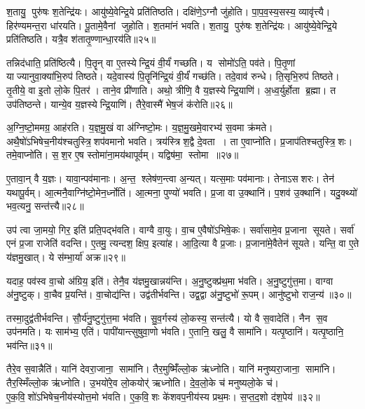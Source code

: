 श॒तायु॒ पुरु॑षः श॒तेन्द्रि॑यः।
आयु॑ष्ये॒वेन्द्रि॒ये प्रति॑तिष्ठति।
दक्षि॑णे॒ऽग्नौ जु॑होति।
पा॒प॒व॒स्य॒सस्य॒ व्यावृ॑त्त्यै।
हिर॑ण्यमन्त॒रा धा॑रयति।
पू॒तामे॒वैनां जुहोति।
श॒तमा॑नं भवति।
श॒तायु॒ पुरु॑षः श॒तेन्द्रि॑यः।
आयु॑ष्ये॒वेन्द्रि॒ये प्रति॑तिष्ठति।
यत्रै॒व श॑तातृ॒ण्णान्धा॒रय॑ति॥२५॥

तन्निद॑धाति॒ प्रति॑ष्ठित्यै।
पि॒तॄन् वा ए॒तस्येन्द्रि॒यं वी॒र्यं॑ गच्छति।
य सोमो॑ऽति॒ पव॑ते।
पि॒तृ॒णां याज्यानुवा॒क्या॑भि॒रुप॑ तिष्ठते।
यदे॒वास्य॑ पि॒तॄनि॑न्द्रि॒यं वी॒र्यं॑ गच्छ॑ति।
तदे॒वाव॑ रुन्धे।
ति॒सृभि॒रुप॑ तिष्ठते।
तृ॒तीये॒ वा इ॒तो लो॒के पि॒तर॑।
ताने॒व प्री॑णाति।
अथो॒ त्रीणि॒ वै य॒ज्ञस्येन्द्रि॒याणि॑।
अ॒ध्व॒र्युर्\mbox{}होता ब्र॒ह्मा।
त उप॑तिष्ठन्ते।
यान्ये॒व य॒ज्ञस्येन्द्रि॒याणि॑।
तैरे॒वास्मै॑ भेष॒जं क॑रोति॥२६॥\anuvakamend[प्री॒णा॒ति॒ प्र॒थ॒मो दक्षि॑णा स॒मव॑नयति धा॒रय॑तीन्द्रि॒याणि॑ च॒त्वारि॑ च]

अ॒ग्नि॒ष्टो॒ममग्र॒ आह॑रति।
य॒ज्ञ॒मु॒खं वा अ॑ग्निष्टो॒मः।
य॒ज्ञ॒मु॒खमे॒वारभ्य॑ स॒वमा क्र॑मते।
अथै॒षो॑ऽभिषेच॒नीय॑श्चतु\-स्त्रि॒शप॑वमानो भवति।
त्रय॑स्त्रिश॒द्वै दे॒वता।
ता ए॒वाप्नो॑ति।
प्र॒जाप॑तिश्चतुस्त्रि॒शः।
तमे॒वाप्नो॑ति।
स॒श॒र ए॒ष स्तोमा॑ना॒मय॑थापूर्वम्।
यद्विष॑मा॒ स्तोमा॥२७॥

ए॒तावा॒न् वै य॒ज्ञः।
यावा॒न्पव॑मानाः।
अ॒न्त॒ श्लेष॑ण॒न्त्वा अ॒न्यत्।
यत्स॒माः पव॑मानाः।
तेनाऽसशरः।
तेन॑ यथापू॒र्वम्।
आ॒त्मनै॒वाग्नि॑ष्टो॒मेन॒र्ध्नोति॑।
आ॒त्मना॒ पुण्यो॑ भवति।
प्र॒जा वा उ॒क्थानि॑।
प॒शव॑ उ॒क्थानि॑।
यदु॒क्थ्यो॑ भव॒त्यनु॒ सन्त॑त्त्यै॥२८॥\anuvakamend[स्तोमा प॒शव॑ उ॒क्थान्येकं च]

उप॑ त्वा जा॒मयो॒ गिर॒ इति॑ प्रति॒पद्भ॑वति।
वाग्वै वा॒युः।
वा॒च ए॒वैषो॑ऽभिषे॒कः।
सर्वा॑सामे॒व प्र॒जाना सूयते।
सर्वा॑ एनं प्र॒जा राजेति॑ वदन्ति।
ए॒तमु॒ त्यन्दश॒ क्षिप॒ इत्या॑ह।
आ॒दि॒त्या वै प्र॒जाः।
प्र॒जाना॑मे॒वैतेन॑ सूयते।
यन्ति॒ वा ए॒ते य॑ज्ञमु॒खात्।
ये स॑म्भा॒र्या॑ अक्र\sn{}॥२९॥

यदाह॒ पव॑स्व वा॒चो अ॑ग्रिय॒ इति॑।
तेनै॒व य॑ज्ञमु॒खान्नय॑न्ति।
अ॒नु॒ष्टुक्प्र॑थ॒मा भ॑वति।
अ॒नु॒ष्टुगु॑त्त॒मा।
वाग्वा अ॑नु॒ष्टुक्।
वा॒चैव प्र॒यन्ति॑।
वा॒चोद्य॑न्ति।
उद्व॑तीर्भवन्ति।
उद्व॒द्वा अ॑नु॒ष्टुभो॑ रू॒पम्।
आनु॑ष्टुभो राज॒न्य॑॥३०॥

तस्मा॒दुद्व॑तीर्भवन्ति।
सौ॒र्य॑नु॒ष्टुगु॑त्त॒मा भ॑वति।
सु॒व॒र्गस्य॑ लो॒कस्य॒ सन्त॑त्यै।
यो वै स॒वादेति॑।
नैन स॒व उप॑नमति।
यः साम॑भ्य॒ एति॑।
पापी॑यान्त्सुषुवा॒णो भ॑वति।
ए॒तानि॒ खलु॒ वै सामा॑नि।
यत्पृ॒ष्ठानि॑।
यत्पृ॒ष्ठानि॒ भव॑न्ति॥३१॥

तैरे॒व स॒वान्नैति॑।
यानि॑ देवरा॒जाना॒ सामा॑नि।
तैर॒मुष्मिँ॑ल्लो॒क ऋ॑ध्नोति।
यानि॑ मनुष्यरा॒जाना॒ सामा॑नि।
तैर॒स्मिँल्लो॒क ऋ॑ध्नोति।
उ॒भयो॑रे॒व लो॒कयोर्॑ ऋध्नोति।
दे॒व॒लो॒के च॑ मनुष्यलो॒के च॑।
ए॒क॒वि॒शो॑ऽभिषेच॒नीय॑स्योत्त॒मो भ॑वति।
ए॒क॒वि॒शः के॑शवप॒नीय॑स्य प्रथ॒मः।
स॒प्त॒द॒शो द॑श॒पेय॑॥३२॥

